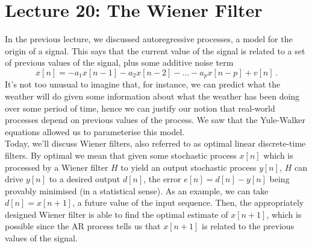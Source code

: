\section{Lecture 20: The Wiener Filter}
%
In the previous lecture, we discussed autoregressive processes,
a model for the origin of a signal. This says that the current
value of the signal is related to a set of previous values of
the signal, plus some additive noise term
%
\begin{displaymath}
  x[n] = -a_1x[n-1] - a_2x[n-2] - \hdots - a_px[n-p] + v[n] \,.
\end{displaymath}
%
It's not too unusual to imagine that, for instance, we can
predict what the weather will do given some information about
what the weather has been doing over some period of time, hence
we can justify our notion that real-world processes depend on
previous values of the process. We saw that the Yule-Walker
equations allowed us to parameterise this model.\\
%
Today, we'll discuss Wiener filters, also referred to as
optimal linear discrete-time filters. By optimal we mean that
given some stochastic process $x[n]$ which is processed by
a Wiener filter $H$ to yield an output stochastic process $y[n]$,
$H$ can drive $y[n]$ to a desired output $d[n]$, the error
$e[n] = d[n] - y[n]$ being provably minimised (in a statistical
sense). As an example, we can take $d[n] = x[n+1]$, a future value
of the input sequence. Then, the appropriately designed Wiener
filter is able to find the optimal estimate of $x[n+1]$, which is
possible since the AR process tells us that $x[n+1]$ is related
to the previous values of the signal.

